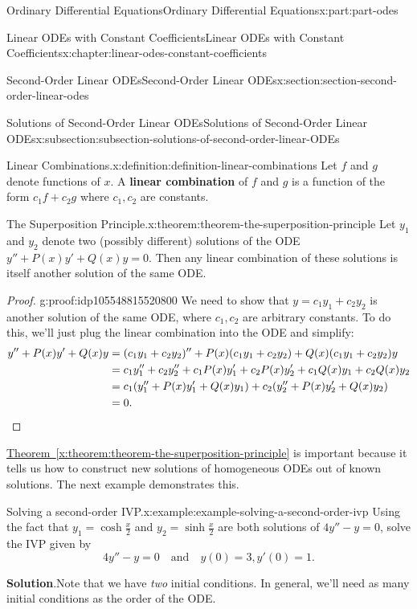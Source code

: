 \documentclass[twoside,10pt,]{book}
\newcommand{\blocktitlefont}{\relax}
\newcommand{\xreffont}{\relax}
\newcommand{\terminology}[1]{\textbf{#1}}
\numberwithin{equation}{part}
\newcommand{\qedhere}{\relax}
\newcommand{\amp}{&}
\begin{document}
\begin{partptx}{Ordinary Differential Equations}{}{Ordinary Differential Equations}{}{}{x:part:part-odes}
\begin{chapterptx}{Linear ODEs with Constant Coefficients}{}{Linear ODEs with Constant Coefficients}{}{}{x:chapter:linear-odes-constant-coefficients}
\begin{sectionptx}{Second-Order Linear ODEs}{}{Second-Order Linear ODEs}{}{}{x:section:section-second-order-linear-odes}
\begin{subsectionptx}{Solutions of Second-Order Linear ODEs}{}{Solutions of Second-Order Linear ODEs}{}{}{x:subsection:subsection-solutions-of-second-order-linear-ODEs}
\begin{definition}{Linear Combinations.}{x:definition:definition-linear-combinations}
Let \(f\) and \(g\) denote functions of \(x\). A \terminology{linear combination} of \(f\) and \(g\) is a function of the form \(c_{1}f+c_{2}g\) where \(c_{1},c_{2}\) are constants.%
\end{definition}
\begin{theorem}{The Superposition Principle.}{}{x:theorem:theorem-the-superposition-principle}%
%
Let \(y_{1}\) and \(y_{2}\) denote two (possibly different) solutions of the ODE \(y''+P(x)y'+Q(x)y = 0\). Then any linear combination of these solutions is itself another solution of the same ODE.%
\end{theorem}
\begin{proof}{}{g:proof:idp105548815520800}
We need to show that \(y = c_{1}y_{1} + c_{2}y_{2}\) is another solution of the same ODE, where \(c_{1},c_{2}\) are arbitrary constants. To do this, we'll just plug the linear combination into the ODE and simplify:%
\begin{align*}
y''+P(x)y'+Q(x)y \amp = (c_{1}y_{1}+c_{2}y_{2})''+P(x)(c_{1}y_{1}+c_{2}y_{2})+Q(x)(c_{1}y_{1}+c_{2}y_{2})y \\
\amp = c_{1}y''_{1}+c_{2}y''_{2} + c_{1}P(x)y'_{1}+c_{2}P(x)y'_{2} + c_{1}Q(x)y_{1} + c_{2}Q(x)y_{2}\\
\amp = c_{1}(y''_{1}+P(x)y'_{1}+Q(x)y_{1}) + c_{2}(y''_{2}+P(x)y'_{2}+Q(x)y_{2}) \\
\amp = 0. \qedhere
\end{align*}
%
\end{proof}
\hyperref[x:theorem:theorem-the-superposition-principle]{Theorem~{\xreffont\ref{x:theorem:theorem-the-superposition-principle}}} is important because it tells us how to construct new solutions of homogeneous ODEs out of known solutions. The next example demonstrates this.%
\begin{example}{Solving a second-order IVP.}{x:example:example-solving-a-second-order-ivp}%
Using the fact that \(y_{1} = \cosh\frac{x}{2}\) and \(y_{2} = \sinh\frac{x}{2}\) are both solutions of \(4y''-y = 0\), solve the IVP given by%
\begin{equation*}
4y''-y=0\quad\text{and}\quad y(0)=3,y'(0)=1.
\end{equation*}
%
\par\smallskip%
\noindent\textbf{\blocktitlefont Solution}.\hypertarget{g:solution:idp105548815526432}{}\quad{}Note that we have \emph{two} initial conditions. In general, we'll need as many initial conditions as the order of the ODE.%
\par

\end{example}
\end{subsectionptx}
\end{sectionptx}
\end{chapterptx}
\end{partptx}
\end{document}

